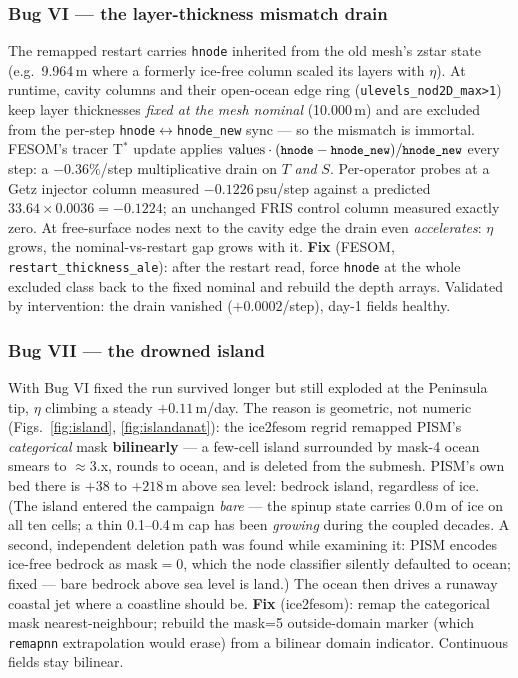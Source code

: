 \documentclass[11pt,a4paper]{article}
\newcommand{\code}[1]{\texttt{\small #1}}
\begin{document}
\subsubsection*{Bug VI --- the layer-thickness mismatch drain}
The remapped restart carries \code{hnode} inherited from the old mesh's zstar state (e.g.\
9.964\,m where a formerly ice-free column scaled its layers with $\eta$). At runtime,
cavity columns and their open-ocean edge ring (\code{ulevels\_nod2D\_max>1}) keep layer
thicknesses \emph{fixed at the mesh nominal} (10.000\,m) and are excluded from the per-step
\code{hnode}$\leftrightarrow$\code{hnode\_new} sync --- so the mismatch is immortal. FESOM's
tracer T$^{*}$ update applies
$\mathrm{values}\cdot(\code{hnode}-\code{hnode\_new})/\code{hnode\_new}$ every step: a
$-0.36\%$/step multiplicative drain on $T$ \emph{and} $S$. Per-operator probes at a Getz
injector column measured $-0.1226$\,psu/step against a predicted
$33.64\times0.0036=-0.1224$; an unchanged FRIS control column measured exactly zero. At
free-surface nodes next to the cavity edge the drain even \emph{accelerates}: $\eta$ grows,
the nominal-vs-restart gap grows with it. \textbf{Fix} (FESOM,
\code{restart\_thickness\_ale}): after the restart read, force \code{hnode} at the whole
excluded class back to the fixed nominal and rebuild the depth arrays. Validated by
intervention: the drain vanished ($+0.0002$/step), day-1 fields healthy.

\subsubsection*{Bug VII --- the drowned island}
With Bug VI fixed the run survived longer but still exploded at the Peninsula tip, $\eta$
climbing a steady $+0.11$\,m/day. The reason is geometric, not numeric
(Figs.~\ref{fig:island}, \ref{fig:islandanat}): the ice2fesom regrid remapped PISM's \emph{categorical} mask
\textbf{bilinearly} --- a few-cell island surrounded by mask-4 ocean smears to
$\approx$3.x, rounds to ocean, and is deleted from the submesh. PISM's own bed there is
$+38$ to $+218$\,m above sea level: bedrock island, regardless of ice. (The island entered
the campaign \emph{bare} --- the spinup state carries 0.0\,m of ice on all ten cells; a
thin 0.1--0.4\,m cap has been \emph{growing} during the coupled decades. A second,
independent deletion path was found while examining it: PISM encodes ice-free bedrock as
mask$=$0, which the node classifier silently defaulted to ocean; fixed --- bare bedrock
above sea level is land.) The ocean then drives a runaway coastal jet where a coastline should be.
\textbf{Fix} (ice2fesom): remap the categorical mask nearest-neighbour; rebuild the mask=5
outside-domain marker (which \code{remapnn} extrapolation would erase) from a bilinear
domain indicator. Continuous fields stay bilinear.
\end{document}
